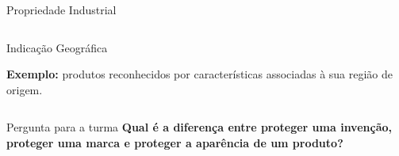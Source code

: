 \documentclass[9pt]{beamer}
\begin{document}
\begin{frame}{Propriedade Industrial}
\begin{columns}[T]
\begin{block}{Indicação Geográfica}
      \vspace{0.1cm}

      \textbf{Exemplo:}
      produtos reconhecidos por características
      associadas à sua região de origem.
    \end{block}

  \end{columns}

  \vspace{0.05cm}

  \begin{alertblock}{Pergunta para a turma}
    \small
    \textbf{Qual é a diferença entre proteger uma invenção,
    proteger uma marca e proteger a aparência de um produto?}
  \end{alertblock}

\end{frame}
\end{document}
